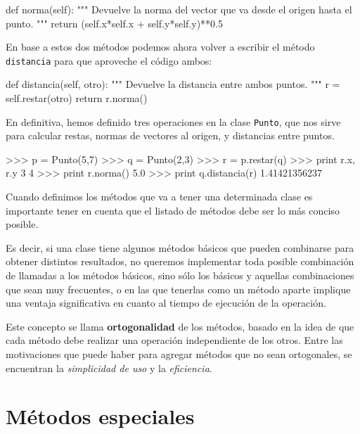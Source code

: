 \begin{codigo-python-sn}
    def norma(self):
        """ Devuelve la norma del vector que va desde el origen
            hasta el punto. """
        return (self.x*self.x + self.y*self.y)**0.5
\end{codigo-python-sn}

En base a estos dos métodos podemos ahora volver a escribir el método
\lstinline!distancia! para que aproveche el código ambos:

\begin{codigo-python-sn}
    def distancia(self, otro):
        """ Devuelve la distancia entre ambos puntos. """
        r = self.restar(otro)
        return r.norma()
\end{codigo-python-sn}

En definitiva, hemos definido tres operaciones en la clase
\lstinline!Punto!, que nos sirve para calcular restas, normas de vectores
al origen, y distancias entre puntos.

\begin{codigo-python-sn}
>>> p = Punto(5,7)
>>> q = Punto(2,3)
>>> r = p.restar(q)
>>> print r.x, r.y
3 4
>>> print r.norma()
5.0
>>> print q.distancia(r)
1.41421356237
\end{codigo-python-sn}

\begin{atencion}
Cuando definimos los métodos que va a tener una determinada clase es
importante tener en cuenta que el listado de métodos debe ser lo más
conciso posible.

Es decir, si una clase tiene algunos métodos básicos que pueden combinarse
para obtener distintos resultados, no queremos implementar toda posible
combinación de llamadas a los métodos básicos, sino sólo los básicos y
aquellas combinaciones que sean muy frecuentes, o en las que
tenerlas como un método aparte implique una ventaja significativa en cuanto
al tiempo de ejecución de la operación.

Este concepto se llama {\bf ortogonalidad} de los métodos, basado en la
idea de que cada método debe realizar una operación independiente de los
otros.  Entre las motivaciones que puede haber para agregar métodos que no
sean ortogonales, se encuentran la {\it simplicidad de uso} y la {\it
eficiencia}.
\end{atencion}

\section{Métodos especiales}


